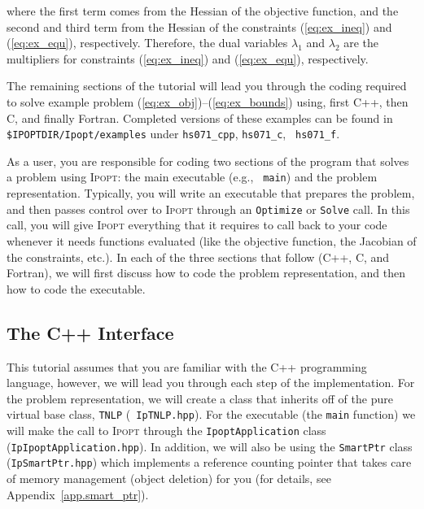 \documentclass[10pt]{article}
\newcommand{\Ipopt}{\textsc{Ipopt}\xspace}
\begin{document}
where the first term comes from the Hessian of the objective function,
and the second and third term from the Hessian of the constraints
(\ref{eq:ex_ineq}) and (\ref{eq:ex_equ}), respectively. Therefore, the
dual variables $\lambda_1$ and $\lambda_2$ are the multipliers
for constraints (\ref{eq:ex_ineq}) and (\ref{eq:ex_equ}), respectively.

\vspace{\baselineskip}

The remaining sections of the tutorial will lead you through
the coding required to solve example problem
(\ref{eq:ex_obj})--(\ref{eq:ex_bounds}) using, first C++, then C, and finally
Fortran. Completed versions of these examples can be found in {\tt
\$IPOPTDIR/Ipopt/examples} under {\tt hs071\_cpp}, {\tt hs071\_c}, {\tt
hs071\_f}.

As a user, you are responsible for coding two sections of the program
that solves a problem using \Ipopt: the main executable (e.g., {\tt
  main}) and the problem representation.  Typically, you will write an
executable that prepares the problem, and then passes control over to
\Ipopt through an {\tt Optimize} or {\tt Solve} call. In this call,
you will give \Ipopt everything that it requires to call back to your
code whenever it needs functions evaluated (like the objective
function, the Jacobian of the constraints, etc.).  In each of the
three sections that follow (C++, C, and Fortran), we will first
discuss how to code the problem representation, and then how to code
the executable.

\subsection{The C++ Interface} \label{sec.cppinterface}
This tutorial assumes that you are familiar with the C++ programming
language, however, we will lead you through each step of the
implementation. For the problem representation, we will create a class
that inherits off of the pure virtual base class, {\tt TNLP} ({\tt
  IpTNLP.hpp}). For the executable (the {\tt main} function) we will
make the call to \Ipopt through the {\tt IpoptApplication} class
({\tt IpIpoptApplication.hpp}). In addition, we will also be using the
{\tt SmartPtr} class ({\tt IpSmartPtr.hpp}) which implements a reference
counting pointer that takes care of memory management (object
deletion) for you (for details, see Appendix~\ref{app.smart_ptr}).
\end{document}

